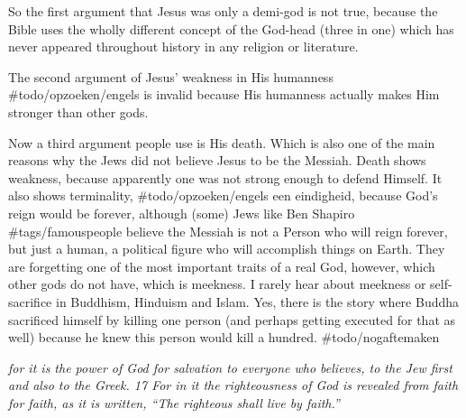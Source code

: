 So the first argument that Jesus was only a demi-god is not true,
because the Bible uses the wholly different concept of the God-head
(three in one) which has never appeared throughout history in any
religion or literature.

The second argument of Jesus' weakness in His humanness
\#todo/opzoeken/engels is invalid because His humanness actually makes
Him stronger than other gods.

Now a third argument people use is His death. Which is also one of the
main reasons why the Jews did not believe Jesus to be the Messiah. Death
shows weakness, because apparently one was not strong enough to defend
Himself. It also shows terminality, \#todo/opzoeken/engels een
eindigheid, because God's reign would be forever, although (some) Jews
like Ben Shapiro \#tags/famouspeople believe the Messiah is not a Person
who will reign forever, but just a human, a political figure who will
accomplish things on Earth. They are forgetting one of the most
important traits of a real God, however, which other gods do not have,
which is meekness. I rarely hear about meekness or self-sacrifice in
Buddhism, Hinduism and Islam. Yes, there is the story where Buddha
sacrificed himself by killing one person (and perhaps getting executed
for that as well) because he knew this person would kill a hundred.
\#todo/nogaftemaken

\emph{for it is the power of God for salvation to everyone who believes,
to the Jew first and also to the Greek. 17 For in it the righteousness
of God is revealed from faith for faith, as it is written, ``The
righteous shall live by faith.''}

